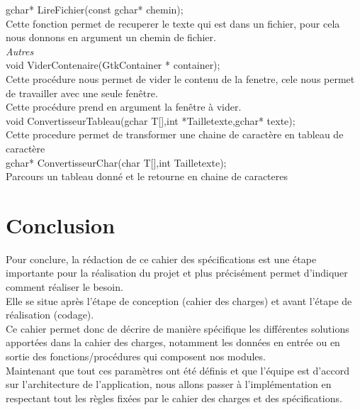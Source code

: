 \documentclass[a4]{article}
\begin{document}
		
	gchar* LireFichier(const gchar* chemin);\\
		Cette fonction permet de recuperer le texte qui est dans un fichier, pour cela nous donnons en argument un chemin de fichier.\\
	
	\textit{Autres}\\
	
	void ViderContenaire(GtkContainer * container);\\
		Cette procédure nous permet de vider le contenu de la fenetre, cele nous permet de travailler avec une seule fenêtre.\\
		Cette procédure prend en argument la fenêtre à vider.\\
	
	void ConvertisseurTableau(gchar T[],int *Tailletexte,gchar* texte);\\
		Cette procedure permet de transformer une chaine de caractère en tableau de caractère\\
	 
	gchar* ConvertisseurChar(char T[],int Tailletexte); \\
		Parcours un tableau donné et le retourne en chaine de caracteres\\
		
	
	\section{Conclusion}
	
	Pour conclure, la rédaction de ce cahier des spécifications est une étape importante pour la réalisation du projet
	et plus précisément permet d'indiquer comment réaliser le besoin.\\
	
	Elle se situe après l'étape de conception (cahier des charges) et avant l'étape de réalisation (codage).\\
	
	Ce cahier permet donc de décrire de manière spécifique les différentes solutions apportées dans la cahier des charges, notamment les données en entrée
	ou en sortie des fonctions/procédures qui composent nos modules.\\
	
	Maintenant que tout ces paramètres ont été définis et que l'équipe est d'accord sur l'architecture de l'application, nous allons
	passer à l'implémentation en respectant tout les règles fixées par le cahier des charges et des spécifications.
	
\end{document}
